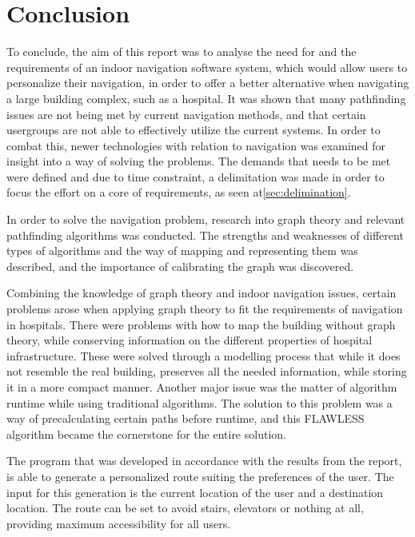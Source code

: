\chapter{Conclusion}

To conclude, the aim of this report was to analyse the need for and the requirements of an indoor navigation software system, which would allow users to personalize their navigation, in order to offer a better alternative when navigating a large building complex, such as a hospital. It was shown that many pathfinding issues are not being met by current navigation methods, and that certain usergroups are not able to effectively utilize the current systems. In order to combat this, newer technologies with relation to navigation was examined for insight into a way of solving the problems. The demands that needs to be met were defined and due to time constraint, a delimitation was made in order to focus the effort on a core of requirements, as seen at\cref{sec:delimination}.

In order to solve the navigation problem, research into graph theory and relevant pathfinding algorithms was conducted. The strengths and weaknesses of different types of algorithms and the way of mapping and representing them was described, and the importance of calibrating the graph was discovered. 

Combining the knowledge of graph theory and indoor navigation issues, certain problems arose when applying graph theory to fit the requirements of navigation in hospitals. There were problems with how to map the building without graph theory, while conserving information on the different properties of hospital infrastructure. These were solved through a modelling process that while it does not resemble the real building, preserves all the needed information, while storing it in a more compact manner. Another major issue was the matter of algorithm runtime while using traditional algorithms. The solution to this problem was a way of precalculating certain paths before runtime, and this FLAWLESS algorithm became the cornerstone for the entire solution.

The program that was developed in accordance with the results from the report, is able to generate a personalized route suiting the preferences of the user. The input for this generation is the current location of the user and a destination location. The route can be set to avoid stairs, elevators or nothing at all, providing maximum accessibility for all users.